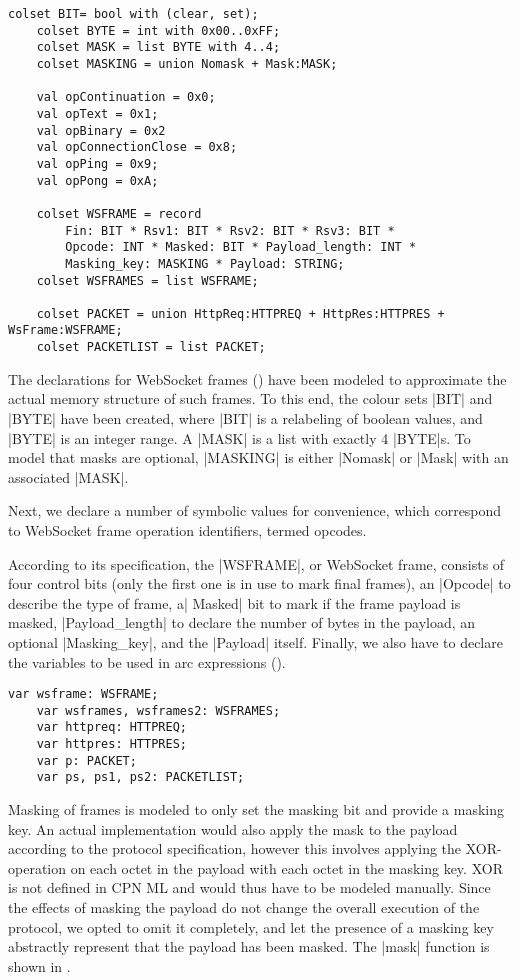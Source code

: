 	\begin{lstlisting}[label=lst:client_lib_colset_ws,caption=WebSocket colour
	sets,gobble=1,float] 
	colset BIT= bool with (clear, set);
	colset BYTE = int with 0x00..0xFF;
	colset MASK = list BYTE with 4..4;
	colset MASKING = union Nomask + Mask:MASK;
	
	val opContinuation = 0x0;
	val opText = 0x1;
	val opBinary = 0x2
	val opConnectionClose = 0x8;
	val opPing = 0x9;
	val opPong = 0xA;
	
	colset WSFRAME = record
		Fin: BIT * Rsv1: BIT * Rsv2: BIT * Rsv3: BIT * 
		Opcode: INT * Masked: BIT * Payload_length: INT * 
		Masking_key: MASKING * Payload: STRING;
	colset WSFRAMES = list WSFRAME;
	
	colset PACKET = union HttpReq:HTTPREQ + HttpRes:HTTPRES + WsFrame:WSFRAME;
	colset PACKETLIST = list PACKET;
	\end{lstlisting}
	
	The declarations for WebSocket frames () have
	been modeled to approximate the actual memory structure of such frames. To this
	end, the colour sets |BIT| and |BYTE| have been created, where |BIT| is a
	relabeling of boolean values, and |BYTE| is an integer range. A |MASK| is a
	list with exactly 4 |BYTE|s. To model that masks are optional, |MASKING| is
	either |Nomask| or |Mask| with an associated |MASK|.
	
	Next, we declare a number of symbolic values for convenience, which correspond
	to WebSocket frame operation identifiers, termed opcodes. 
	
	According to its specification, the |WSFRAME|, or WebSocket frame, consists
	of four control bits (only the first one is in use to mark final frames), an
	|Opcode| to describe the type of frame, a| Masked| bit to mark if the frame
	payload is masked, |Payload_length| to declare the number of bytes in the
	payload, an optional |Masking_key|, and the |Payload| itself. Finally, we
	also have to declare the variables to be used in arc expressions
	().
	
	\begin{lstlisting}[label=lst:client_lib_vars,caption=WebSocket
	Module Variables,gobble=1,float=h] 
	var wsframe: WSFRAME;
	var wsframes, wsframes2: WSFRAMES;
	var httpreq: HTTPREQ;
	var httpres: HTTPRES;
	var p: PACKET;
	var ps, ps1, ps2: PACKETLIST;
	\end{lstlisting}
	
	Masking of frames is modeled to only set the masking bit and provide a masking
	key. An actual implementation would also apply the mask to the payload
	according to the protocol specification, however this involves applying the
	XOR-operation on each octet in the payload with each octet in the masking key.
	XOR is not defined in CPN ML and would thus have to be modeled manually. Since
	the effects of masking the payload do not change the overall execution of the
	protocol, we opted to omit it completely, and let the presence of a masking key
	abstractly represent that the payload has been masked. The |mask| function is
	shown in .
	
